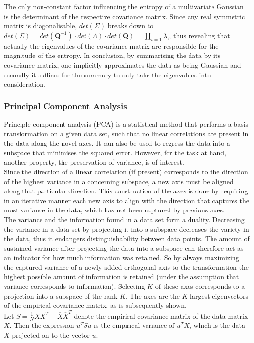 \documentclass[a4paper, 11pt]{article}
\begin{document}
The only non-constant factor influencing the entropy of a multivariate Gaussian is the determinant of the respective covariance matrix.
Since any real symmetric matrix is diagonalisable, $det(\Sigma)$ breaks down to $det(\Sigma) = det(\mathbf{Q}^{-1}) \cdot det(\Lambda)\cdot det(\mathbf{Q}) = \prod_{i = 1} \lambda_{i}$, thus revealing that actually the eigenvalues of the covariance matrix are responsible for the magnitude of the entropy. In conclusion, by summarising the data by its covariance matrix, one implicitly approximates the data as being Gaussian and secondly it suffices for the summary to only take the eigenvalues into consideration.

\subsubsection{Principal Component Analysis}

Principle component analysis (PCA) is a statistical method that performs a basis transformation on a given data set, such that no linear correlations are present in the data along the novel axes. It can also be used to regress the data into a subspace that minimises the squared error. However, for the task at hand, another property, the preservation of variance, is of interest.\\
Since the direction of a linear correlation (if present) corresponds to the direction of the highest variance in a concerning subspace, a new axis must be aligned along that particular direction. This construction of the axes is done by requiring in an iterative manner each new axis to align with the direction that captures the most variance in the data, which has not been captured by previous axes.\\
The variance and the information found in a data set form a duality. Decreasing the variance in a data set by projecting it into a subspace decreases the variety in the data, thus it endangers distinguishability between data points. The amount of sustained variance after projecting the data into a subspace can therefore act as an indicator for how much information was retained. So by always maximizing the captured variance of a newly added orthogonal axis to the transformation the highest possible amount of information is retained  (under the assumption that variance corresponds to information). Selecting $K$ of these axes corresponds to a projection into a subspace of the rank $K$. The axes are the $K$ largest eigenvectors of the empirical covariance matrix, as is subsequently shown. 
\\
Let $S = \frac{1}{N}XX^T - \overline{X} \overline{X}^T$ denote the empirical covariance matrix of the data matrix $X$. Then the expression $u^TSu$ is the empirical variance of $u^TX$, which is the data $X$ projected on to the vector $u$.
\end{document}
